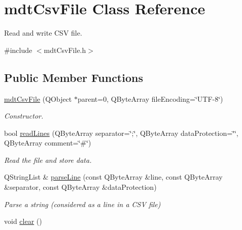 \hypertarget{classmdt_csv_file}{
\section{mdtCsvFile Class Reference}
\label{classmdt_csv_file}
}


Read and write CSV file.  




{\ttfamily \#include $<$mdtCsvFile.h$>$}

\subsection*{Public Member Functions}
\begin{DoxyCompactItemize}
\item 
\hypertarget{classmdt_csv_file_a8c9f24190d83f32672f360f0fcc53d2f}{
\hyperlink{classmdt_csv_file_a8c9f24190d83f32672f360f0fcc53d2f}{mdtCsvFile} (QObject $\ast$parent=0, QByteArray fileEncoding=\char`\"{}UTF-\/8\char`\"{})}
\label{classmdt_csv_file_a8c9f24190d83f32672f360f0fcc53d2f}

\begin{DoxyCompactList}\small\item\em Constructor. \end{DoxyCompactList}\item 
bool \hyperlink{classmdt_csv_file_ab2d9754e50db179825813081bb129797}{readLines} (QByteArray separator=\char`\"{};\char`\"{}, QByteArray dataProtection=\char`\"{}\char`\"{}, QByteArray comment=\char`\"{}\#\char`\"{})
\begin{DoxyCompactList}\small\item\em Read the file and store data. \end{DoxyCompactList}\item 
QStringList \& \hyperlink{classmdt_csv_file_af44de864675351a6f22b176e64a4cecc}{parseLine} (const QByteArray \&line, const QByteArray \&separator, const QByteArray \&dataProtection)
\begin{DoxyCompactList}\small\item\em Parse a string (considered as a line in a CSV file) \end{DoxyCompactList}\item 
\hypertarget{classmdt_csv_file_afe815d4fbdc08c442c9b1dce447cda75}{
void \hyperlink{classmdt_csv_file_afe815d4fbdc08c442c9b1dce447cda75}{clear} ()}
\label{classmdt_csv_file_afe815d4fbdc08c442c9b1dce447cda75}


\end{DoxyCompactItemize}
